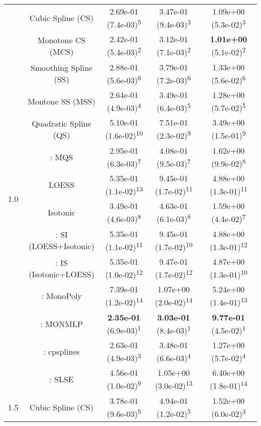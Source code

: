 \begin{tabular}{ccccc}
\midrule
\multirow{14}{*}{1.0}&Cubic Spline (CS)& 2.69e-01 (7.4e-03)\textsuperscript{5}& 3.47e-01 (9.4e-03)\textsuperscript{3}& 1.09e+00 (5.3e-02)\textsuperscript{3}\tabularnewline
&Monotone CS (MCS)& 2.42e-01 (5.4e-03)\textsuperscript{2}& 3.12e-01 (7.1e-03)\textsuperscript{2}& \textbf{1.01e+00} (5.1e-02)\textsuperscript{2}\tabularnewline
&Smoothing Spline (SS)& 2.88e-01 (5.6e-03)\textsuperscript{6}& 3.79e-01 (7.2e-03)\textsuperscript{6}& 1.33e+00 (5.6e-02)\textsuperscript{6}\tabularnewline
&Montone SS (MSS)& 2.64e-01 (4.9e-03)\textsuperscript{4}& 3.49e-01 (6.4e-03)\textsuperscript{5}& 1.28e+00 (5.7e-02)\textsuperscript{5}\tabularnewline
&Quadratic Spline (QS)& 5.10e-01 (1.6e-02)\textsuperscript{10}& 7.51e-01 (2.3e-02)\textsuperscript{9}& 3.49e+00 (1.5e-01)\textsuperscript{9}\tabularnewline
&\textcite{heMonotoneBsplineSmoothing1998}: MQS& 2.95e-01 (6.3e-03)\textsuperscript{7}& 4.08e-01 (9.5e-03)\textsuperscript{7}& 1.62e+00 (9.9e-02)\textsuperscript{8}\tabularnewline
&LOESS& 5.35e-01 (1.1e-02)\textsuperscript{13}& 9.45e-01 (1.7e-02)\textsuperscript{11}& 4.88e+00 (1.3e-01)\textsuperscript{11}\tabularnewline
&Isotonic& 3.49e-01 (4.6e-03)\textsuperscript{8}& 4.63e-01 (6.1e-03)\textsuperscript{8}& 1.59e+00 (4.4e-02)\textsuperscript{7}\tabularnewline
&\textcite{mammenEstimatingSmoothMonotone1991}: SI (LOESS+Isotonic)& 5.35e-01 (1.1e-02)\textsuperscript{11}& 9.45e-01 (1.7e-02)\textsuperscript{10}& 4.88e+00 (1.3e-01)\textsuperscript{12}\tabularnewline
&\textcite{mammenEstimatingSmoothMonotone1991}: IS (Isotonic+LOESS)& 5.35e-01 (1.0e-02)\textsuperscript{12}& 9.47e-01 (1.7e-02)\textsuperscript{12}& 4.87e+00 (1.3e-01)\textsuperscript{10}\tabularnewline
&\textcite{murrayFastFlexibleMethods2016a}: MonoPoly& 7.39e-01 (1.2e-02)\textsuperscript{14}& 1.07e+00 (2.0e-02)\textsuperscript{14}& 5.24e+00 (1.4e-01)\textsuperscript{13}\tabularnewline
&\textcite{cannonMonmlpMultilayerPerceptron2017}: MONMLP& \textbf{2.35e-01} (6.9e-03)\textsuperscript{1}& \textbf{3.03e-01} (8.4e-03)\textsuperscript{1}& \textbf{9.77e-01} (4.5e-02)\textsuperscript{1}\tabularnewline
&\textcite{navarro-garciaConstrainedSmoothingOutofrange2023}: cpsplines& 2.63e-01 (4.9e-03)\textsuperscript{3}& 3.48e-01 (6.6e-03)\textsuperscript{4}& 1.27e+00 (5.7e-02)\textsuperscript{4}\tabularnewline
&\textcite{groeneboomConfidenceIntervalsMonotone2023}: SLSE& 4.56e-01 (1.0e-02)\textsuperscript{9}& 1.05e+00 (3.0e-02)\textsuperscript{13}& 6.40e+00 (1.8e-01)\textsuperscript{14}\tabularnewline
\midrule
\multirow{14}{*}{1.5}&Cubic Spline (CS)& 3.78e-01 (9.6e-03)\textsuperscript{5}& 4.94e-01 (1.2e-02)\textsuperscript{5}& 1.52e+00 (6.0e-02)\textsuperscript{3}\tabularnewline

\end{tabular}
